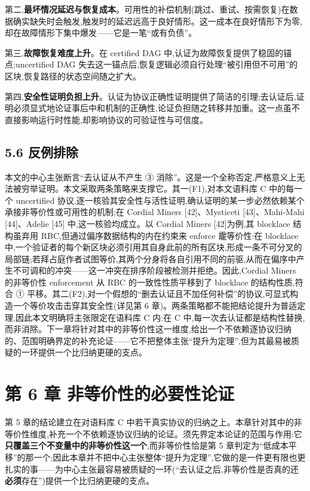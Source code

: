 \documentclass[UTF8,fontset=windows,a4paper,11pt]{ctexart}
\begin{document}
第二,\textbf{最坏情况延迟与恢复成本}。可用性的补偿机制(跳过、重试、按需恢复)在数据确实缺失时会触发,触发时的延迟远高于良好情形。这一成本在良好情形下为零,却在故障情形下集中爆发------它是一笔``或有负债''。

第三,\textbf{故障恢复难度上升}。在 certified DAG
中,认证为故障恢复提供了稳固的锚点;uncertified DAG
失去这一锚点后,恢复逻辑必须自行处理``被引用但不可用''的区块,恢复路径的状态空间随之扩大。

第四,\textbf{安全性证明负担上升}。认证为协议正确性证明提供了简洁的引理;去认证后,证明必须显式地论证事后中和机制的正确性,论证负担随之转移并加重。这一点虽不直接影响运行时性能,却影响协议的可验证性与可信度。

\subsection{5.6 反例排除}\label{ux53cdux4f8bux6392ux9664}

本文的中心主张断言``去认证从不产生 ③
消除''。这是一个全称否定,严格意义上无法被穷举证明。本文采取两条策略来支撑它。其一(F1),对本文语料库
C 中的每一个 uncertified
协议,逐一核验其安全性与活性证明,确认证明的某一步必然依赖某个承接非等价性或可用性的机制;在
Cordial Miners {[}42{]}、Mysticeti {[}43{]}、Mahi-Mahi {[}44{]}、Adelie
{[}45{]}
中,这一核验均成立。以 Cordial Miners {[}42{]}为例,其 blocklace 结构虽弃用 RBC,但通过偏序数据结构的内在约束来 enforce 靇等价性:在 blocklace 中,一个验证者的每个新区块必须引用其自身此前的所有区块,形成一条不可分叉的局部链;若拜占庭作者试图等价,其两个分身将各自引用不同的前驱,从而在偏序中产生不可调和的冲突------这一冲突在排序阶段被检测并拒绝。因此,Cordial Miners 的非等价性 enforcement 从 RBC 的一致性性质平移到了 blocklace 的结构性质,符合 ① 平移。其二(F2),对一个假想的``删去认证且不加任何补偿''的协议,可显式构造一个等价攻击击穿其安全性(详见第
6 章)。两条策略都不能把结论提升为普适定理,因此本文明确将主张限定在语料库
C 内:在 C
中,每一次去认证都是结构性替换,而非消除。下一章将针对其中的非等价性这一维度,给出一个不依赖逐协议归纳的、范围明确界定的补充论证------它不把整体主张``提升为定理'',但为其最易被质疑的一环提供一个比归纳更硬的支点。

\section{第 6 章
非等价性的必要性论证}\label{ux7b2c-6-ux7ae0-ux975eux7b49ux4ef7ux6027ux7684ux5fc5ux8981ux6027ux8bbaux8bc1}

第 5 章的结论建立在对语料库 C
中若干真实协议的归纳之上。本章针对其中的非等价性维度,补充一个不依赖逐协议归纳的论证。须先界定本论证的范围与作用:它\textbf{只覆盖三个不变量中的非等价性这一个},而非等价性恰是第
5
章判定为``低成本平移''的那一个;因此本章并不把中心主张整体``提升为定理'',它做的是一件更有限也更扎实的事------为中心主张最容易被质疑的一环(``去认证之后,非等价性是否真的还\textbf{必须}存在'')提供一个比归纳更硬的支点。
\end{document}
